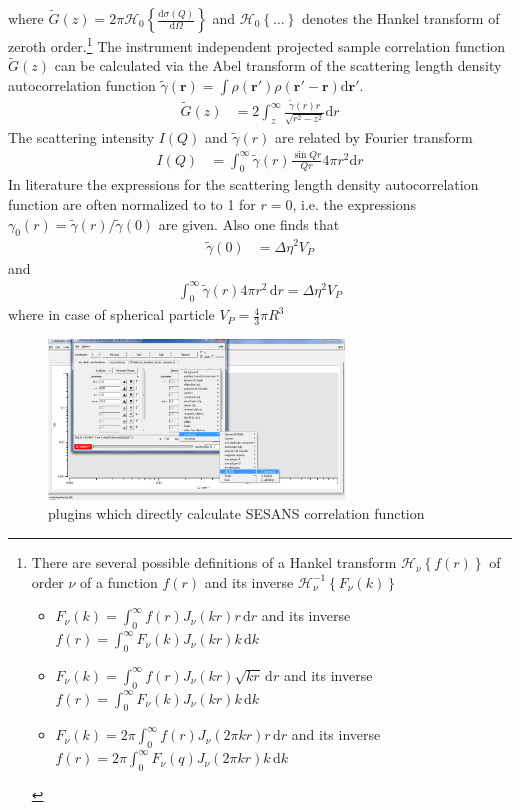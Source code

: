 where $\tilde{G}(z)=2\pi\mathcal{H}_0\left\{\frac{\mathrm{d}\sigma(Q)}{\mathrm{d}\Omega}\right\}$ and $\mathcal{H}_0\left\{\ldots\right\}$ denotes the Hankel transform of zeroth order.\footnote{
There are several possible definitions of a Hankel transform $\mathcal{H}_\nu\left\{f(r)\right\}$ of order $\nu$ of a function $f(r)$ and its inverse $\mathcal{H}_\nu^{-1}\left\{F_\nu(k)\right\}$
\begin{itemize}
\item $F_\nu(k) = \int_0^\infty f(r) J_\nu(kr) r \,\mathrm{d}r$ and its inverse $f(r)=\int_0^\infty F_\nu(k)J_\nu(kr) k \,\mathrm{d}k$
\item $F_\nu(k) = \int_0^\infty f(r) J_\nu(kr) \sqrt{kr} \,\mathrm{d}r$ and its inverse $f(r)=\int_0^\infty F_\nu(k)J_\nu(kr) k \, \mathrm{d}k$
\item $F_\nu(k) = 2\pi \int_0^\infty f(r) J_\nu(2\pi kr) r \,\mathrm{d}r$ and its inverse $f(r)=2\pi \int_0^\infty F_\nu(q)J_\nu(2\pi kr) k \,\mathrm{d}k$
\end{itemize}
}
The instrument independent projected sample correlation function $\tilde{G}(z)$ can be calculated via the Abel transform of the scattering length density autocorrelation function $\tilde{\gamma}(\mathbf{r})=\int \rho(\mathbf{r'})\rho(\mathbf{r'-r})\mathrm{d}\mathbf{r'}$.
\begin{align}
\tilde{G}(z) &= 2 \int_z^\infty \frac{\tilde{\gamma}(r) r}{\sqrt{r^2-z^2}} \mathrm{d}r
\end{align}
The scattering intensity $I(Q)$ and  $\tilde{\gamma}(r)$ are related by Fourier transform
\begin{align}
I(Q) &= \int_0^\infty \tilde{\gamma}(r) \frac{\sin Qr}{Qr}4\pi r^2\mathrm{d}r
\end{align}
In literature the expressions for the scattering length density autocorrelation function are often normalized to to 1 for $r=0$, i.e. the expressions $\gamma_0(r)=\tilde{\gamma}(r)/\tilde{\gamma}(0)$ are given. Also one finds that 
\begin{align}
\tilde{\gamma}(0)&=\Delta\eta^2 V_P
\end{align} 
and 
\begin{align}
\int_0^\infty \tilde{\gamma}(r) 4\pi r^2 \, \mathrm{d}r =\Delta\eta^2 V_P
\end{align}
where in case of spherical particle $V_P=\frac43 \pi R^3$

\begin{figure}[htb]
\begin{center}
\includegraphics[width=0.7\textwidth]{../images/GUI/GzPlugins.png}
\end{center}
\caption{\SASfit plugins which directly calculate SESANS correlation function}
\label{fig:HankelOp}
\end{figure}

